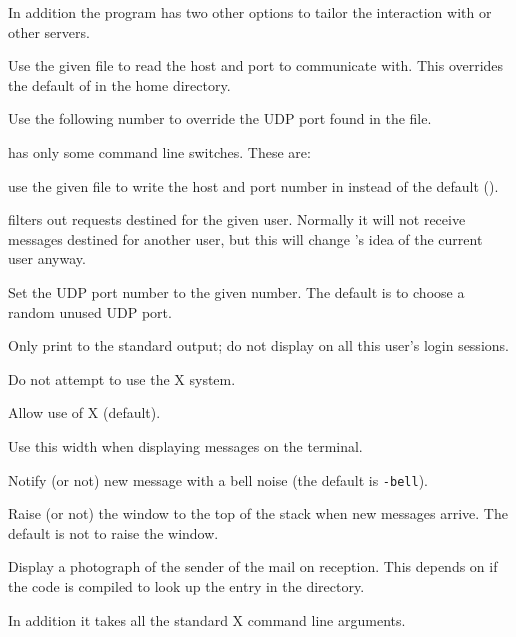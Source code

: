In addition the  program has two other options to tailor
the interaction with  or other servers.

\begin{describe}
\item[\verb|-h hostfile|:] Use the given file to read the host and
port to communicate with. This overrides the default of 
in the home directory.

\item[\verb|-p number|:] Use the following number to override the UDP
port found in the file.
\end{describe}

 has only some command line switches.
These are:
\begin{describe}
\item[\verb|-filename hostfile|:] use the given file to write the host and
port number in instead of the default ().
\item[\verb|-user username|:]  filters out requests
destined for the given user. Normally it will not receive messages
destined for another user, but this will change 's idea of
the current user anyway.

\item[\verb|-port number|:]	Set the UDP port number to the given
number. The default is to choose a random unused UDP port.

\item[\verb|-s|:] Only print to the standard output; do not display
on all this user's login sessions.
\item[\verb|-t|:] Do not attempt to use the X system.
\item[\verb|-x|:] Allow use of X (default).
\item[\verb|-w width|:] Use this width when displaying messages on the
terminal. 
\item[\verb|-bell/-nobell|:] Notify (or not) new message with a
bell noise (the default is \verb|-bell|).

\item[\verb|-autoraise/-noautoraise|:] Raise (or not) the window to
the top of the stack when new messages arrive. The default is not to
raise the window.
\item[\verb|-photos/-nophotos|:] Display a photograph of the sender of
the mail on reception. This depends on if the code is compiled to look
up the entry in the directory.
\end{describe}
In addition it takes
all the standard X command line arguments.

